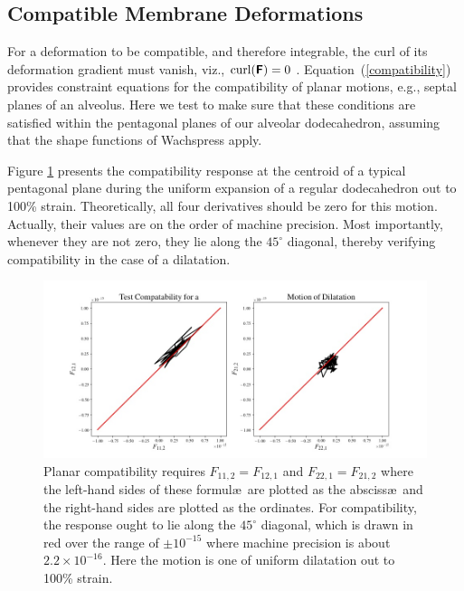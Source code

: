\subsection{Compatible Membrane Deformations}

For a deformation to be compatible, and therefore integrable, the curl of its deformation gradient must vanish, viz., $\textrm{curl} (\boldsymbol{\mathsf{F}}) = \relax{0}$ \cite{Clayton15}. Equation~(\ref{compatibility}) provides constraint equations for the compatibility of planar motions, e.g., septal planes of an alveolus.  Here we test to make sure that these conditions are satisfied within the pentagonal planes of our alveolar dodecahedron, assuming that the shape functions of Wachspress apply.

Figure \ref{figCompatDilatation} presents the compatibility response at the centroid of a typical pentagonal plane during the uniform expansion of a regular dodecahedron out to 100\% strain.   Theoretically, all four derivatives should be zero for this motion. Actually, their values are on the order of machine precision.  Most importantly, whenever they are not zero, they lie along the $45^{\circ}$ diagonal, thereby verifying compatibility in the case of a dilatation.

\begin{figure}
	\centering
	\includegraphics[width=\textwidth]{figures/compatibilityDilatation.jpg}
	\caption{Planar compatibility requires $F_{11,2} = F_{12,1}$ and $F_{22,1} = F_{21,2}$ where the left-hand sides of these formul\ae\ are plotted as the absciss\ae\ and the right-hand sides are plotted as the ordinates.  For compatibility, the response ought to lie along the $45^{\circ}$ diagonal, which is drawn in red over the range of $\pm 10^{-15}$ where machine precision is about $2.2 \times 10^{-16}$.  Here the motion is one of uniform dilatation out to 100\% strain.}
	\label{figCompatDilatation}
\end{figure}

